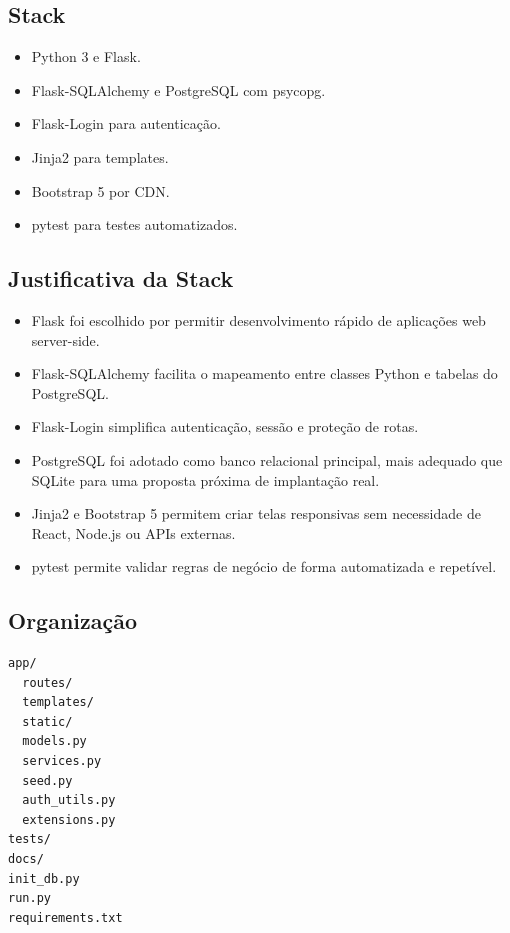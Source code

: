 \documentclass[12pt,a4paper]{article}
\begin{document}
\subsection{Stack}
\begin{itemize}
    \item Python 3 e Flask.
    \item Flask-SQLAlchemy e PostgreSQL com psycopg.
    \item Flask-Login para autenticação.
    \item Jinja2 para templates.
    \item Bootstrap 5 por CDN.
    \item pytest para testes automatizados.
\end{itemize}

\subsection{Justificativa da Stack}
\begin{itemize}
    \item Flask foi escolhido por permitir desenvolvimento rápido de aplicações web server-side.
    \item Flask-SQLAlchemy facilita o mapeamento entre classes Python e tabelas do PostgreSQL.
    \item Flask-Login simplifica autenticação, sessão e proteção de rotas.
    \item PostgreSQL foi adotado como banco relacional principal, mais adequado que SQLite para uma proposta próxima de implantação real.
    \item Jinja2 e Bootstrap 5 permitem criar telas responsivas sem necessidade de React, Node.js ou APIs externas.
    \item pytest permite validar regras de negócio de forma automatizada e repetível.
\end{itemize}

\subsection{Organização}
\begin{verbatim}
app/
  routes/
  templates/
  static/
  models.py
  services.py
  seed.py
  auth_utils.py
  extensions.py
tests/
docs/
init_db.py
run.py
requirements.txt
\end{verbatim}
\end{document}
